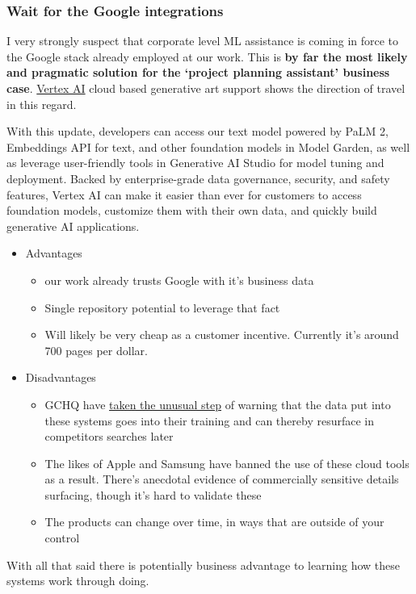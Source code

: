 \subsubsection{Wait for the Google integrations}
I very strongly suspect that corporate level ML assistance is coming in force to the Google stack already employed at our work. This is \textbf{by far the most likely and pragmatic solution for the `project planning assistant' business case}. \href{}{Vertex AI} cloud based generative art support shows the direction of travel in this regard.  \begin{tcolorbox}[enhanced, frame style={fill=lightgray}, interior style={fill=lightgray}]
With this update, developers can access our text model powered by PaLM 2, Embeddings API for text, and other foundation models in Model Garden, as well as leverage user-friendly tools in Generative AI Studio for model tuning and deployment. Backed by enterprise-grade data governance, security, and safety features, Vertex AI can make it easier than ever for customers to access foundation models, customize them with their own data, and quickly build generative AI applications.
\end{tcolorbox}
\begin{itemize}
\item Advantages
\begin{itemize}
\item our work already trusts Google with it's business data
\item Single repository potential to leverage that fact
\item Will likely be very cheap as a customer incentive. Currently it's around 700 pages per dollar.
\end{itemize}
\item Disadvantages
\begin{itemize}
\item GCHQ have \href{https://www.ncsc.gov.uk/blog-post/chatgpt-and-large-language-models-whats-the-risk}{taken the unusual step} of warning that the data put into these systems goes into their training and can thereby resurface in competitors searches later
\item The likes of Apple and Samsung have banned the use of these cloud tools as a result. There's anecdotal evidence of commercially sensitive details surfacing, though it's hard to validate these
\item The products can change over time, in ways that are outside of your control
\end{itemize}
\end{itemize}
With all that said there is potentially business advantage to learning how these systems work through doing.
